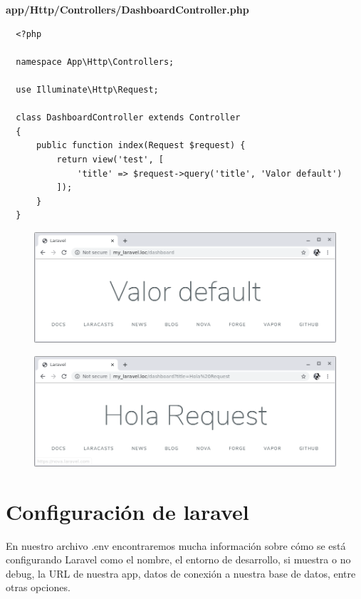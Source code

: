 \documentclass{article}
\begin{document}
\textbf{app/Http/Controllers/DashboardController.php}
\begin{verbatim}
  <?php

  namespace App\Http\Controllers;

  use Illuminate\Http\Request;

  class DashboardController extends Controller
  {
      public function index(Request $request) {
          return view('test', [
              'title' => $request->query('title', 'Valor default')
          ]);
      }
  }
\end{verbatim}

\begin{figure}[h!]
  \centering
  \includegraphics[scale=0.5]{./Pictures/020_title_default.png}
\end{figure}

\begin{figure}[h!]
  \centering
  \includegraphics[scale=0.5]{./Pictures/021_title_hola_request.png}
\end{figure}

\newpage


\section{Configuración de laravel}%
En nuestro archivo .env encontraremos mucha información sobre cómo se está
configurando Laravel como el nombre, el entorno de desarrollo, si muestra o no
debug, la URL de nuestra app, datos de conexión a nuestra base de datos, entre
otras opciones.\\
\end{document}
